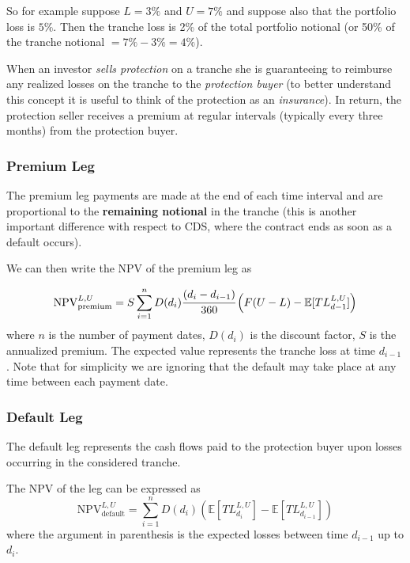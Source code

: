 So for example suppose $L=3\%$ and $U=7\%$ and suppose also that the portfolio loss is $5\%$. Then the tranche loss is 2\% of the total portfolio notional (or 50\% of the tranche notional $=7\%-3\%=4\%$).

When an investor \emph{sells protection} on a tranche she is guaranteeing to reimburse any realized losses on the tranche to the \emph{protection buyer} (to better understand this concept it is useful to think of the protection as an \emph{insurance}). 
In return, the protection seller receives a premium at regular intervals (typically every three months) from the protection buyer.

\subsubsection{Premium Leg}
The premium leg payments are made at the end of each time interval and are proportional to the \textbf{remaining notional} in the tranche (this is another important difference with respect to CDS, where the contract ends as soon as a default occurs).

We can then write the NPV of the premium leg as

\begin{equation}
\mathrm{NPV}_{\mathrm{premium}}^{L,U}=S\sum^{n}_{i=1}D(d_i)\cfrac{(d_i - d_{i-1})}{360}\left(F(U-L)-\mathbb{E}[TL_{d-1}^{L,U}]\right)
\label{eq:cdo_npv_premium}
\end{equation}
where $n$ is the number of payment dates, $D(d_i)$ is the discount factor, $S$ is the annualized premium. The expected value represents the tranche loss at time $d_{i-1}$. Note that for simplicity we are ignoring that the default may take place at any time between each payment date.

\subsubsection{Default Leg}
The default leg represents the cash flows paid to the protection buyer upon losses occurring in the considered tranche. 

The NPV of the leg can be expressed as
\begin{equation}
\mathrm{NPV}_{\mathrm{default}}^{L,U}=\sum_{i=1}^{n}D(d_i)\left(\mathbb{E}[TL_{d_i}^{L,U}]-\mathbb{E}[TL_{d_{i-1}}^{L,U}]\right)
\label{eq:cdo_npv_default}
\end{equation}
where the argument in parenthesis is the expected losses between time $d_{i-1}$ up to $d_i$. 

